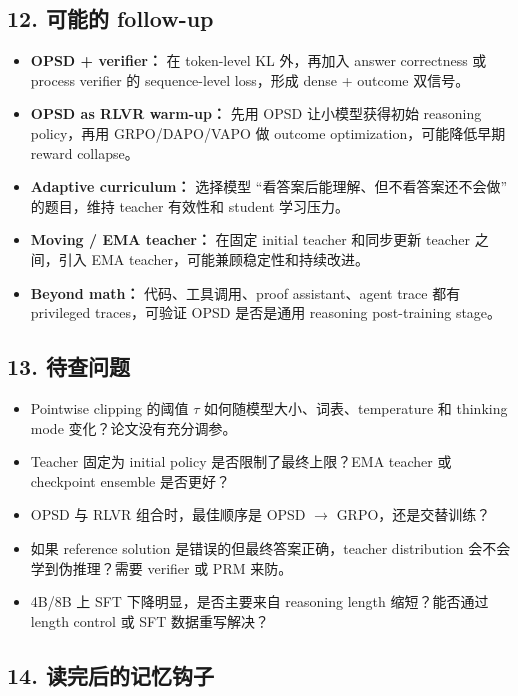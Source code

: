 \subsection{12. 可能的 follow-up}

\begin{itemize}[leftmargin=1.5em]
  \item \textbf{OPSD + verifier：} 在 token-level KL 外，再加入 answer correctness 或 process verifier 的 sequence-level loss，形成 dense + outcome 双信号。
  \item \textbf{OPSD as RLVR warm-up：} 先用 OPSD 让小模型获得初始 reasoning policy，再用 GRPO/DAPO/VAPO 做 outcome optimization，可能降低早期 reward collapse。
  \item \textbf{Adaptive curriculum：} 选择模型 ``看答案后能理解、但不看答案还不会做'' 的题目，维持 teacher 有效性和 student 学习压力。
  \item \textbf{Moving / EMA teacher：} 在固定 initial teacher 和同步更新 teacher 之间，引入 EMA teacher，可能兼顾稳定性和持续改进。
  \item \textbf{Beyond math：} 代码、工具调用、proof assistant、agent trace 都有 privileged traces，可验证 OPSD 是否是通用 reasoning post-training stage。
\end{itemize}

\subsection{13. 待查问题}

\begin{itemize}[leftmargin=1.5em]
  \item Pointwise clipping 的阈值 $\tau$ 如何随模型大小、词表、temperature 和 thinking mode 变化？论文没有充分调参。
  \item Teacher 固定为 initial policy 是否限制了最终上限？EMA teacher 或 checkpoint ensemble 是否更好？
  \item OPSD 与 RLVR 组合时，最佳顺序是 OPSD $\rightarrow$ GRPO，还是交替训练？
  \item 如果 reference solution 是错误的但最终答案正确，teacher distribution 会不会学到伪推理？需要 verifier 或 PRM 来防。
  \item 4B/8B 上 SFT 下降明显，是否主要来自 reasoning length 缩短？能否通过 length control 或 SFT 数据重写解决？
\end{itemize}

\subsection{14. 读完后的记忆钩子}

